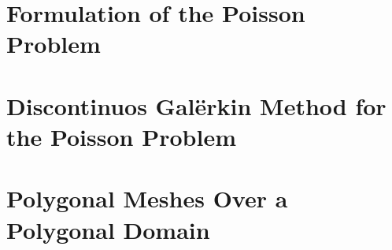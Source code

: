 \documentclass[12pt]{article}
\title{\reporttitle}
\author{Andrea Di Antonio, 10655477} %
\date{Exam session of July, 2024 \\ Academic Year 2023-24}
\begin{document}
	\maketitle
	\thispagestyle{fancy}

	\begin{abstract}
		\begin{center}
			Report for the course \textit{Advanced Programming for Scientific Computing} on the implementation details of an adaptive HP discontinuous Galërkin algorithm.
		\end{center}
	\end{abstract}

	\newpage
	\tableofcontents

	\newpage
    \section{Formulation of the Poisson Problem}
	

	\newpage
    \section{Discontinuos Galërkin Method for the Poisson Problem}
	

	\newpage
    \section{Polygonal Meshes Over a Polygonal Domain}
	
\end{document}
